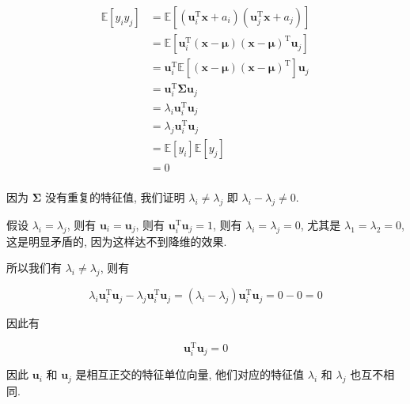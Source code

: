 \documentclass[answers]{exam}  %
\begin{document}
\begin{questions}
\begin{solution}
\begin{enumerate}
            $$
              \begin{aligned}
                \mathbb{E}[y_i y_j]
                 & = \mathbb{E}[(\bm{u}_i^{\mathrm{T}}\bm{x} + a_i)(\bm{u}_j^{\mathrm{T}}\bm{x} + a_j)]           \\
                 & = \mathbb{E}[\bm{u}_i^{\mathrm{T}}(\bm{x} - \bm{\mu})(\bm{x} - \bm{\mu})^{\mathrm{T}}\bm{u}_j] \\
                 & = \bm{u}_i^{\mathrm{T}}\mathbb{E}[(\bm{x} - \bm{\mu})(\bm{x} - \bm{\mu})^{\mathrm{T}}]\bm{u}_j \\
                 & = \bm{u}_i^{\mathrm{T}}\bm{\Sigma}\bm{u}_j                                                     \\
                 & = \lambda_i\bm{u}_i^{\mathrm{T}}\bm{u}_j                                                       \\
                 & = \lambda_j\bm{u}_i^{\mathrm{T}}\bm{u}_j                                                       \\
                 & = \mathbb{E}[y_i]\mathbb{E}[y_j]                                                               \\
                 & = 0                                                                                            \\
              \end{aligned}
            $$

            因为 $\bm{\Sigma}$ 没有重复的特征值, 我们证明 $\lambda_i \neq \lambda_j$ 即 $\lambda_i - \lambda_j \neq 0$.

            假设 $\lambda_i = \lambda_j$, 则有 $\bm{u}_i = \bm{u}_j$, 则有 $\bm{u}_i^{\mathrm{T}}\bm{u}_j = 1$, 则有 $\lambda_i = \lambda_j = 0$, 尤其是 $\lambda_1 = \lambda_2 = 0$, 这是明显矛盾的, 因为这样达不到降维的效果.

            所以我们有 $\lambda_i \neq \lambda_j$, 则有

            $$
              \lambda_i\bm{u}_i^{\mathrm{T}}\bm{u}_j - \lambda_j\bm{u}_i^{\mathrm{T}}\bm{u}_j = (\lambda_i - \lambda_j)\bm{u}_i^{\mathrm{T}}\bm{u}_j = 0 - 0 = 0
            $$

            因此有

            $$
              \bm{u}_i^{\mathrm{T}}\bm{u}_j = 0
            $$

            因此 $\bm{u}_i$ 和 $\bm{u}_j$ 是相互正交的特征单位向量, 他们对应的特征值 $\lambda_i$ 和 $\lambda_j$ 也互不相同.


\end{enumerate}
\end{solution}
\end{questions}
\end{document}
